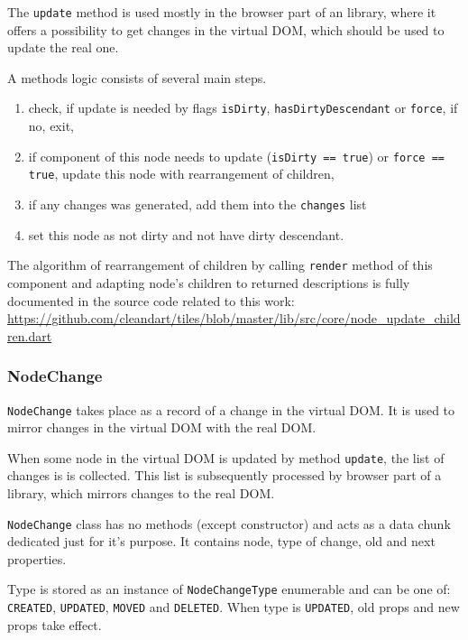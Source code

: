       The \texttt{update} method is used mostly in the browser part of an library, where it offers a possibility to get changes in the virtual DOM, which should be used to update the real one. 

      A methods logic consists of several main steps.
      \begin{enumerate}
        \item check, if update is needed by flags \texttt{isDirty}, \texttt{hasDirtyDescendant} or \texttt{force}, if no, exit,
        \item if component of this node needs to update (\texttt{isDirty == true}) or \texttt{force == true}, update this node with rearrangement of children,
        \item if any changes was generated, add them into the \texttt{changes} list
        \item set this node as not dirty and not have dirty descendant.
      \end{enumerate}

      The algorithm of rearrangement of children by calling \texttt{render} method of this component 
      and adapting node's children to returned descriptions is fully documented in the source code related to this work: 
      \url{https://github.com/cleandart/tiles/blob/master/lib/src/core/node_update_children.dart}

    \subsubsection{NodeChange}\label{subsubsec:our-architecture-core-node-change}
      \texttt{NodeChange} takes place as a record of a change in the virtual DOM. 
      It is used to mirror changes in the virtual DOM with the real DOM. 

      When some node in the virtual DOM is updated by method \texttt{update}, the list of changes is is collected.
      This list is subsequently processed by browser part of a library, which mirrors changes to the real DOM.

      \texttt{NodeChange} class has no methods (except constructor) and acts as a data chunk dedicated just for it's purpose. 
      It contains node, type of change, old and next properties. 

      Type is stored as an instance of \texttt{NodeChangeType} enumerable and can be one of: \texttt{CREATED}, \texttt{UPDATED}, 
      \texttt{MOVED} and \texttt{DELETED}. 
      When type is \texttt{UPDATED}, old props and new props take effect. 

